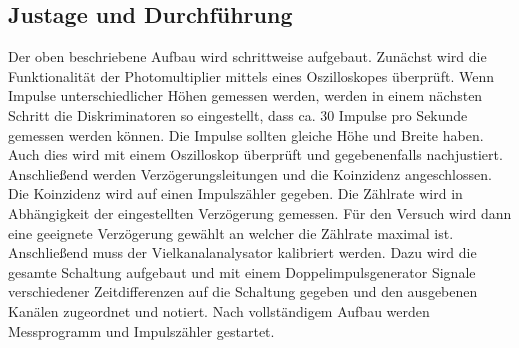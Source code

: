 \subsection{Justage und Durchführung}
Der oben beschriebene Aufbau wird schrittweise aufgebaut. 
Zunächst wird die Funktionalität der Photomultiplier mittels eines Oszilloskopes überprüft.
Wenn Impulse unterschiedlicher Höhen gemessen werden, werden in einem nächsten Schritt die Diskriminatoren 
so eingestellt, dass ca. 30 Impulse pro Sekunde gemessen werden können. Die Impulse sollten gleiche Höhe 
und Breite haben. Auch dies wird mit einem Oszilloskop überprüft und gegebenenfalls nachjustiert.
Anschließend werden Verzögerungsleitungen und die Koinzidenz angeschlossen. Die Koinzidenz wird auf einen Impulszähler 
gegeben. Die Zählrate wird in Abhängigkeit der eingestellten Verzögerung gemessen.
Für den Versuch wird dann eine geeignete Verzögerung gewählt an welcher die Zählrate maximal ist.
Anschließend muss der Vielkanalanalysator kalibriert werden. Dazu wird die gesamte Schaltung aufgebaut und 
mit einem Doppelimpulsgenerator Signale verschiedener Zeitdifferenzen auf die Schaltung gegeben und den ausgebenen
Kanälen zugeordnet und notiert.
Nach vollständigem Aufbau werden Messprogramm und Impulszähler gestartet.



